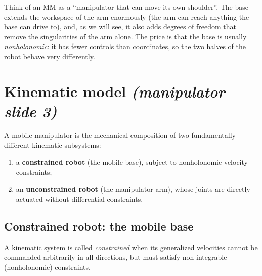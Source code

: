 \documentclass[11pt,a4paper]{article}
\theoremstyle{definition}
\theoremstyle{plain}
\theoremstyle{remark}
\begin{document}
\begin{intuition}
Think of an MM as a ``manipulator that can move its own shoulder''. The base extends the workspace of the arm enormously (the arm can reach anything the base can drive to), and, as we will see, it also adds degrees of freedom that remove the singularities of the arm alone. The price is that the base is usually \emph{nonholonomic}: it has fewer controls than coordinates, so the two halves of the robot behave very differently.
\end{intuition}

\section{Kinematic model \emph{(manipulator slide 3)}}

A mobile manipulator is the mechanical composition of two fundamentally different kinematic subsystems:
\begin{enumerate}[leftmargin=*,nosep]
\item a \textbf{constrained robot} (the mobile base), subject to nonholonomic velocity constraints;
\item an \textbf{unconstrained robot} (the manipulator arm), whose joints are directly actuated without differential constraints.
\end{enumerate}

\subsection*{Constrained robot: the mobile base}

A kinematic system is called \emph{constrained} when its generalized velocities cannot be commanded arbitrarily in all directions, but must satisfy non-integrable (nonholonomic) constraints.
\end{document}
